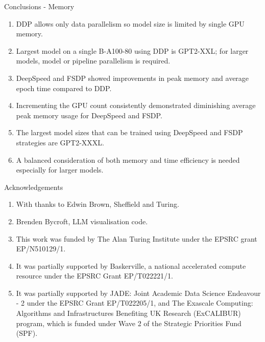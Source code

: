 \documentclass[t]{beamer}
\begin{document}
\begin{frame}{Conclusions - Memory}

\begin{enumerate}
  \item DDP allows only data parallelism so model size is limited by single GPU memory.
  \item Largest model on a single B-A100-80 using DDP is GPT2-XXL; for larger models, model or pipeline parallelism is required.
  \item DeepSpeed and FSDP showed improvements in peak memory and average epoch time compared to DDP.
  \item Incrementing the GPU count consistently demonstrated diminishing average peak memory usage for DeepSpeed and FSDP.
  \item The largest model sizes that can be trained using DeepSpeed and FSDP strategies are GPT2-XXXL.
  \item A balanced consideration of both memory and time efficiency is needed especially for larger models.
\end{enumerate}

\end{frame}

\begin{frame}{Acknowledgements}

\begin{enumerate}
  \item With thanks to Edwin Brown, Sheffield and Turing.
  \item Brenden Bycroft, LLM visualisation code.
  \item This work was funded by The Alan Turing Institute under the EPSRC grant EP/N510129/1.
  \item It was partially supported by Baskerville, a national accelerated compute resource under the EPSRC Grant EP/T022221/1.
  \item It was partially supported by JADE: Joint Academic Data Science Endeavour - 2 under the EPSRC Grant EP/T022205/1, and The Exascale Computing: Algorithms and Infrastructures Benefiting UK Research (ExCALIBUR) program, which is funded under Wave 2 of the Strategic Priorities Fund (SPF).
\end{enumerate}

\end{frame}
\end{document}
